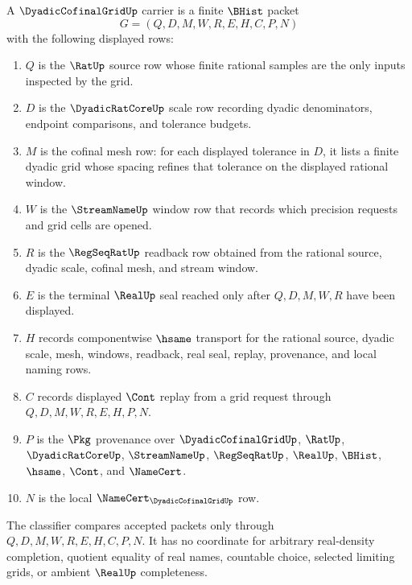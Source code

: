 \begin{definition}
\label{def:dyadic-cofinal-grid-carrier}
A $\DyadicCofinalGridUp$ carrier is a finite $\BHist$ packet
$$
G=(Q,D,M,W,R,E,H,C,P,N)
$$
with the following displayed rows:
\begin{enumerate}
\item $Q$ is the $\RatUp$ source row whose finite rational samples are the only inputs inspected by the grid.
\item $D$ is the $\DyadicRatCoreUp$ scale row recording dyadic denominators, endpoint comparisons, and tolerance budgets.
\item $M$ is the cofinal mesh row: for each displayed tolerance in $D$, it lists a finite dyadic grid whose spacing refines that tolerance on the displayed rational window.
\item $W$ is the $\StreamNameUp$ window row that records which precision requests and grid cells are opened.
\item $R$ is the $\RegSeqRatUp$ readback row obtained from the rational source, dyadic scale, cofinal mesh, and stream window.
\item $E$ is the terminal $\RealUp$ seal reached only after $Q,D,M,W,R$ have been displayed.
\item $H$ records componentwise $\hsame$ transport for the rational source, dyadic scale, mesh, windows, readback, real seal, replay, provenance, and local naming rows.
\item $C$ records displayed $\Cont$ replay from a grid request through $Q,D,M,W,R,E,H,P,N$.
\item $P$ is the $\Pkg$ provenance over $\DyadicCofinalGridUp$, $\RatUp$, $\DyadicRatCoreUp$, $\StreamNameUp$, $\RegSeqRatUp$, $\RealUp$, $\BHist$, $\hsame$, $\Cont$, and $\NameCert$.
\item $N$ is the local $\NameCert_{\DyadicCofinalGridUp}$ row.
\end{enumerate}
The classifier compares accepted packets only through $Q,D,M,W,R,E,H,C,P,N$. It has no coordinate for arbitrary real-density completion, quotient equality of real names, countable choice, selected limiting grids, or ambient $\RealUp$ completeness.
\end{definition}


